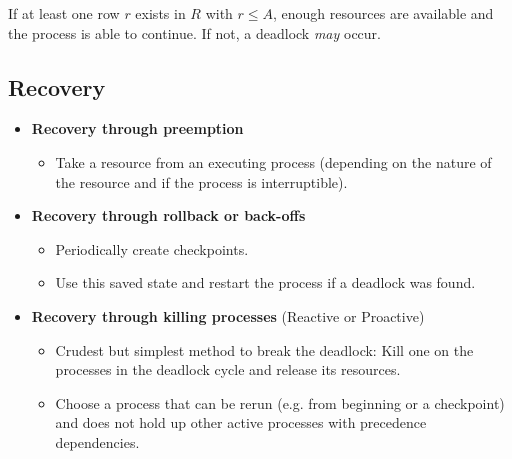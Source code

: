 \documentclass[a4paper, 11pt, accentcolor = tud3b]{tudreport}
\begin{document}
		                If at least one row \(r\) exists in \(R\) with \( r \leq A \), enough resources are available and the process is able to continue. If not, a deadlock \textit{may} occur.

            \subsection{Recovery}
                \begin{itemize}
                	\item \textbf{Recovery through preemption}
	                	\begin{itemize}
	                		\item Take a resource from an executing process (depending on the nature of the resource and if the process is interruptible).
	                	\end{itemize}
                	\item \textbf{Recovery through rollback or back-offs}
	                	\begin{itemize}
	                		\item Periodically create checkpoints.
	                		\item Use this saved state and restart the process if a deadlock was found.
	                	\end{itemize}
                	\item \textbf{Recovery through killing processes} (Reactive or Proactive)
	                	\begin{itemize}
	                		\item Crudest but simplest method to break the deadlock: Kill one on the processes in the deadlock cycle and release its resources.
	                		\item Choose a process that can be rerun (e.g. from beginning or a checkpoint) and does not hold up other active processes with precedence dependencies.
	                	\end{itemize}
                \end{itemize}
\end{document}
